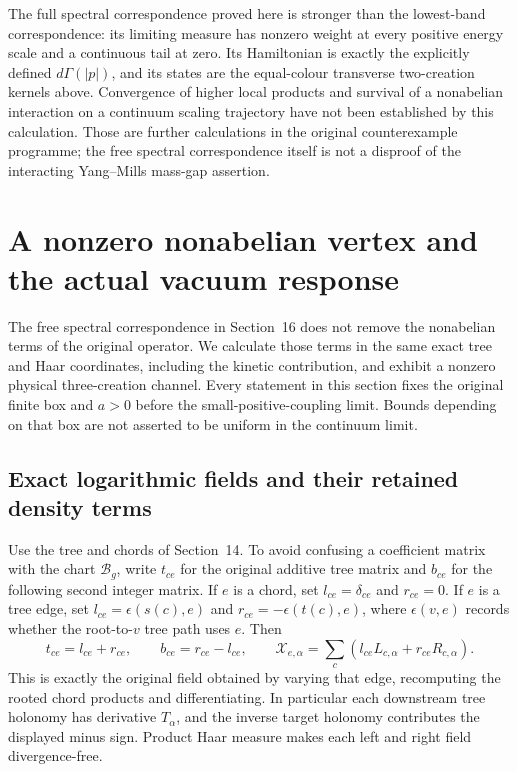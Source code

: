 \documentclass[11pt]{article}
\begin{document}
The full spectral correspondence proved here is stronger than the
lowest-band correspondence: its limiting measure has nonzero
weight at every positive energy scale and a continuous tail at
zero. Its Hamiltonian is exactly the explicitly defined
$d\Gamma(|p|)$, and its states are the equal-colour transverse
two-creation kernels above. Convergence of higher local products
and survival of a nonabelian interaction on a continuum scaling
trajectory have not been established by this calculation. Those
are further calculations in the original counterexample programme;
the free spectral correspondence itself is not a disproof of the
interacting Yang--Mills mass-gap assertion.

\section{A nonzero nonabelian vertex and the actual vacuum response}
\label{sec:nonabelian-vertex}

The free spectral correspondence in Section~16 does not remove the
nonabelian terms of the original operator. We calculate those terms
in the same exact tree and Haar coordinates, including the kinetic
contribution, and exhibit a nonzero physical three-creation channel.
Every statement in this section fixes the original finite box and
$a>0$ before the small-positive-coupling limit. Bounds depending on
that box are not asserted to be uniform in the continuum limit.

\subsection{Exact logarithmic fields and their retained density terms}

Use the tree and chords of Section~14. To avoid confusing a coefficient
matrix with the chart $\mathcal B_g$, write $t_{ce}$ for the original
additive tree matrix and $b_{ce}$ for the following second integer
matrix. If $e$ is a chord, set
$l_{ce}=\delta_{ce}$ and $r_{ce}=0$. If $e$ is a tree edge, set
$l_{ce}=\epsilon(s(c),e)$ and $r_{ce}=-\epsilon(t(c),e)$, where
$\epsilon(v,e)$ records whether the root-to-$v$ tree path uses $e$.
Then
\begin{equation}\label{eq:vertex-integer-matrices}
 t_{ce}=l_{ce}+r_{ce},\qquad b_{ce}=r_{ce}-l_{ce},\qquad
 \mathcal X_{e,\alpha}=
       \sum_c(l_{ce}L_{c,\alpha}+r_{ce}R_{c,\alpha}).
\end{equation}
This is exactly the original field obtained by varying that edge,
recomputing the rooted chord products and differentiating. In particular
each downstream tree holonomy has derivative $T_\alpha$, and the
inverse target holonomy contributes the displayed minus sign. Product
Haar measure makes each left and right field divergence-free.
\end{document}
